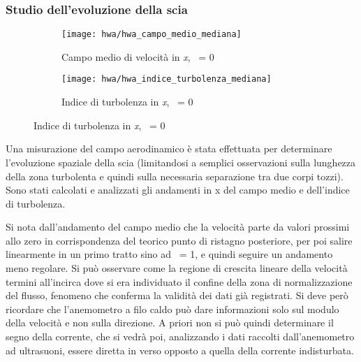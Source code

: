 \documentclass{article} %
\newcommand{\xd}{\nicefrac{\textrm{x}}{\textrm{D}}\ }
\newcommand{\yd}{\nicefrac{\textrm{y}}{\textrm{D}}\ }
\begin{document}
\subsubsection{Studio dell'evoluzione della scia}
\begin{figure}[h!]
	\begin{subfigure}{0.5\textwidth}
		\texttt{[image: hwa/hwa\_campo\_medio\_mediana]}
		\label{hwa_campo_medio_mediana}
		\caption{Campo medio di velocità in \textit{x}, \yd = 0}
	\end{subfigure}
	\begin{subfigure}{0.5\textwidth}
		\texttt{[image: hwa/hwa\_indice\_turbolenza\_mediana]}
		\label{hwa_indice_turbolenza_mediana}
		\caption{Indice di turbolenza in \textit{x}, \yd = 0}		
	\end{subfigure}	
\end{figure}
\begin{minipage}[t]{0.5\textwidth}
	\centering
	\begin{minipage}[t]{0.95\textwidth} \onehalfspacing
		Una misurazione del campo aerodinamico è stata effettuata per determinare l'evoluzione spaziale della scia (limitandosi a semplici osservazioni sulla lunghezza della zona turbolenta e quindi sulla necessaria separazione tra due corpi tozzi). Sono stati calcolati e analizzati gli andamenti in x del campo medio e dell'indice di turbolenza.\par
		Si nota dall'andamento del campo medio che la velocità parte da valori prossimi allo zero in corrispondenza del teorico punto di ristagno posteriore, per poi salire linearmente in un primo tratto sino ad \xd = 1, e quindi seguire un andamento meno regolare. Si può osservare come la regione di crescita lineare della velocità termini all'incirca dove si era individuato il confine della zona di normalizzazione del flusso, fenomeno che conferma la validità dei dati già registrati. Si deve però ricordare che l'anemometro a filo caldo può dare informazioni solo sul modulo della velocità e non sulla direzione. A priori non si può quindi determinare il segno della corrente, che si vedrà poi, analizzando i dati raccolti dall'anemometro ad ultrasuoni, essere diretta in verso opposto a quella della corrente indisturbata.
	\end{minipage}
\end{minipage}
\end{document}
